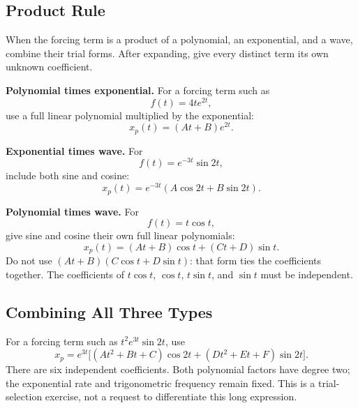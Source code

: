 \documentclass[10pt,letterpaper]{article}
\begin{document}
\subsection{Product Rule}

When the forcing term is a product of a polynomial, an
exponential, and a wave, combine their trial forms.
After expanding, give every distinct term its own
unknown coefficient.

\par\medskip
\textbf{Polynomial times exponential.}
For a forcing term such as
\[
f(t)=4te^{2t},
\]
use a full linear polynomial multiplied by the exponential:
\[
x_p(t)=(At+B)e^{2t}.
\]

\par\medskip
\textbf{Exponential times wave.}
For
\[
f(t)=e^{-3t}\sin 2t,
\]
include both sine and cosine:
\[
x_p(t)=e^{-3t}(A\cos 2t+B\sin 2t).
\]

\par\medskip
\textbf{Polynomial times wave.}
For
\[
f(t)=t\cos t,
\]
give sine and cosine their own full linear polynomials:
\[
x_p(t)=(At+B)\cos t+(Ct+D)\sin t.
\]
Do not use $(At+B)(C\cos t+D\sin t)$: that form ties
the coefficients together. The coefficients of
$t\cos t$, $\cos t$, $t\sin t$, and $\sin t$
must be independent.


\subsection{Combining All Three Types}
For a forcing term such as $t^2e^{3t}\sin 2t$, use
\[
x_p=e^{3t}\bigl[(At^2+Bt+C)\cos 2t+(Dt^2+Et+F)\sin 2t\bigr].
\]
There are six independent coefficients. Both polynomial factors have
 degree two; the exponential rate and trigonometric frequency remain fixed.
This is a trial-selection exercise, not a request to differentiate this long expression.

\end{document}
